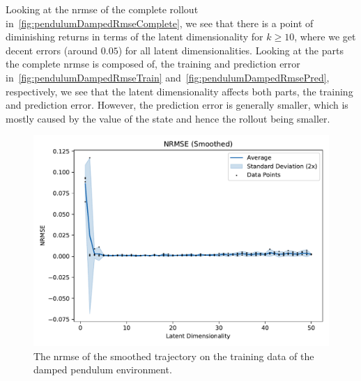 			Looking at the \ac{nrmse} of the complete rollout in~\autoref{fig:pendulumDampedRmseComplete}, we see that there is a point of diminishing returns in terms of the latent dimensionality for \( k \geq 10 \), where we get decent errors (around \( 0.05 \)) for all latent dimensionalities. Looking at the parts the complete \ac{nrmse} is composed of, the training and prediction error in~\autoref{fig:pendulumDampedRmseTrain} and~\autoref{fig:pendulumDampedRmsePred}, respectively, we see that the latent dimensionality affects both parts, the training and prediction error. However, the prediction error is generally smaller, which is mostly caused by the value of the state and hence the rollout being smaller.

			\begin{figure}
				\centering
				\includegraphics[width=0.7\linewidth]{figures/results/pendulum-damped/latent-dim/comparison-rmse-smoothed-normalized-mean-vs-latent-dim.pdf}
				\caption{The \ac{nrmse} of the smoothed trajectory on the training data of the damped pendulum environment.}
				\label{fig:pendulumDampedRmseSmoothed}
			\end{figure}


